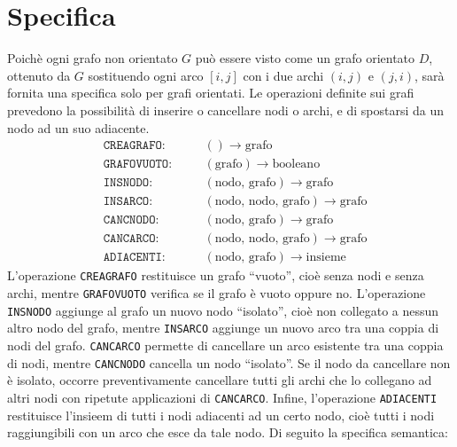\documentclass[12pt]{report}
\begin{document}
   	\section{Specifica}
   	Poichè ogni grafo non orientato $G$ può essere visto come un grafo orientato $D$, ottenuto da $G$ sostituendo ogni arco $[i, j]$ con i due archi $(i, j)$ e $(j, i)$, sarà fornita una specifica solo per grafi orientati. Le operazioni definite sui grafi prevedono la possibilità di inserire o cancellare nodi o archi, e di spostarsi da un nodo ad un suo adiacente.
   	\begin{align*}
   		&\texttt{CREAGRAFO:} &\quad &() \to \text{grafo} \\
   		&\texttt{GRAFOVUOTO:} &\quad &(\text{grafo}) \to \text{booleano} \\
   		&\texttt{INSNODO:} &\quad &(\text{nodo, grafo}) \to \text{grafo} \\
   		&\texttt{INSARCO:} &\quad &(\text{nodo, nodo, grafo}) \to \text{grafo} \\
   		&\texttt{CANCNODO:} &\quad &(\text{nodo, grafo}) \to \text{grafo} \\
   		&\texttt{CANCARCO:} &\quad &(\text{nodo, nodo, grafo}) \to \text{grafo} \\
   		&\texttt{ADIACENTI:} &\quad &(\text{nodo, grafo}) \to \text{insieme}
   	\end{align*}
   	L'operazione \texttt{CREAGRAFO} restituisce un grafo ``vuoto'', cioè senza nodi e senza archi, mentre \texttt{GRAFOVUOTO} verifica se il grafo è vuoto oppure no. L'operazione \texttt{INSNODO} aggiunge al grafo un nuovo nodo ``isolato'', cioè non collegato a nessun altro nodo del grafo, mentre \texttt{INSARCO} aggiunge un nuovo arco tra una coppia di nodi del grafo. \texttt{CANCARCO} permette di cancellare un arco esistente tra una coppia di nodi, mentre \texttt{CANCNODO} cancella un nodo ``isolato''. Se il nodo da cancellare non è isolato, occorre preventivamente cancellare tutti gli archi che lo collegano ad altri nodi con ripetute applicazioni di \texttt{CANCARCO}. Infine, l'operazione \texttt{ADIACENTI} restituisce l'insieem di tutti i nodi adiacenti ad un certo nodo, cioè tutti i nodi raggiungibili con un arco che esce da tale nodo. Di seguito la specifica semantica:
\end{document}
